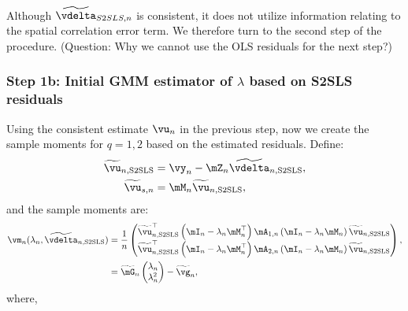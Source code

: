 \documentclass[english,12pt]{book}\usepackage[]{graphicx}\usepackage[]{xcolor}
\begin{document}
Although $\widetilde{\vdelta}_{S2SLS, n}$ is consistent, it does not utilize information relating to the spatial correlation error term. We therefore turn to the second step of the procedure. (Question: Why we cannot use the OLS residuals for the next step?)


\subsubsection{Step 1b: Initial GMM estimator of $\lambda$ based on S2SLS residuals}

Using the consistent estimate $\vu_n$ in the previous step, now we create the sample moments for $q= 1, 2$ based on the estimated residuals. Define:
\begin{equation*}
\begin{aligned}
\widetilde{\vu}_{n, \textrm{S2SLS}} & = \vy_n - \mZ_n\widetilde{\vdelta}_{n, \textrm{S2SLS}}, \\
\widetilde{\vu}_{s, n}        & = \mM_n\widetilde{\vu}_{n, \textrm{S2SLS}},
\end{aligned}
\end{equation*}
%
and the sample moments are:
\begin{equation}\label{eq:momdent_conditions_step}
	\begin{aligned}
		\vm_n(\lambda_n,\widetilde{\vdelta}_{n, \textrm{S2SLS}}) & = \frac{1}{n}
		\begin{pmatrix}
		\widetilde{\vu}_{n, \textrm{S2SLS}}^\top \left(\mI_n - \lambda_n\mM^\top_n\right)\mA_{1,n}\left(\mI_n - \lambda_n\mM_n\right)\widetilde{\vu}_{n, \textrm{S2SLS}} \\
		\widetilde{\vu}_{n, \textrm{S2SLS}}^\top \left(\mI_n - \lambda_n\mM^\top_n\right)\mA_{2,n}\left(\mI_n - \lambda_n\mM_n\right)\widetilde{\vu}_{n, \textrm{S2SLS}}
		\end{pmatrix}, \\
		& = \widetilde{\mG}_n\begin{pmatrix} \lambda_n \\
                \lambda^2_n
\end{pmatrix} - \widetilde{\vg}_n,
	\end{aligned}
\end{equation}
%
where,
\end{document}
